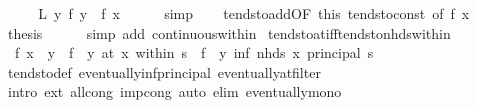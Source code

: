 \begin{isabellebody}
\ \ \isamarkupfalse%
\ \isamarkupfalse%
\ {\isachardoublequoteopen}{\isacharquery}{\kern0pt}L\ {\isacharparenleft}{\kern0pt}{\isasymlambda}y{\isachardot}{\kern0pt}\ f\ y\ {\isacharminus}{\kern0pt}\ f\ x{\isacharparenright}{\kern0pt}{\isachardoublequoteclose}\isanewline
\ \ \ \ \isamarkupfalse%
\ simp\isanewline
\ \ \isamarkupfalse%
\ tendsto{\isacharunderscore}{\kern0pt}add{\isacharbrackleft}{\kern0pt}OF\ this\ tendsto{\isacharunderscore}{\kern0pt}const{\isacharcomma}{\kern0pt}\ of\ {\isachardoublequoteopen}f\ x{\isachardoublequoteclose}{\isacharbrackright}{\kern0pt}\ \isamarkupfalse%
\ {\isacharquery}{\kern0pt}thesis\isanewline
\ \ \ \ \isamarkupfalse%
\ {\isacharparenleft}{\kern0pt}simp\ add{\isacharcolon}{\kern0pt}\ continuous{\isacharunderscore}{\kern0pt}within{\isacharparenright}{\kern0pt}\isanewline
{}\isamarkupfalse%
%
\endisatagproof
{\isafoldproof}%
%
\isadelimproof
%
\endisadelimproof
%
\isadelimdocument
%
\endisadelimdocument
%
\isatagdocument
%
\isamarkuptrue%
%
\endisatagdocument
{\isafolddocument}%
%
\isadelimdocument
%
\endisadelimdocument
{}\isamarkupfalse%
\ tendsto{\isacharunderscore}{\kern0pt}at{\isacharunderscore}{\kern0pt}iff{\isacharunderscore}{\kern0pt}tendsto{\isacharunderscore}{\kern0pt}nhds{\isacharunderscore}{\kern0pt}within{\isacharcolon}{\kern0pt}\isanewline
\ \ {\isachardoublequoteopen}f\ x\ {\isacharequal}{\kern0pt}\ y\ {\isasymLongrightarrow}\ {\isacharparenleft}{\kern0pt}f\ {\isasymlonglongrightarrow}\ y{\isacharparenright}{\kern0pt}\ {\isacharparenleft}{\kern0pt}at\ x\ within\ s{\isacharparenright}{\kern0pt}\ {\isasymlongleftrightarrow}\ {\isacharparenleft}{\kern0pt}f\ {\isasymlonglongrightarrow}\ y{\isacharparenright}{\kern0pt}\ {\isacharparenleft}{\kern0pt}inf\ {\isacharparenleft}{\kern0pt}nhds\ x{\isacharparenright}{\kern0pt}\ {\isacharparenleft}{\kern0pt}principal\ s{\isacharparenright}{\kern0pt}{\isacharparenright}{\kern0pt}{\isachardoublequoteclose}\isanewline
%
\isadelimproof
\ \ %
\endisadelimproof
%
\isatagproof
{}\isamarkupfalse%
\ tendsto{\isacharunderscore}{\kern0pt}def\ eventually{\isacharunderscore}{\kern0pt}inf{\isacharunderscore}{\kern0pt}principal\ eventually{\isacharunderscore}{\kern0pt}at{\isacharunderscore}{\kern0pt}filter\isanewline
\ \ \isamarkupfalse%
\ {\isacharparenleft}{\kern0pt}intro\ ext\ all{\isacharunderscore}{\kern0pt}cong\ imp{\isacharunderscore}{\kern0pt}cong{\isacharparenright}{\kern0pt}\ {\isacharparenleft}{\kern0pt}auto\ elim{\isacharbang}{\kern0pt}{\isacharcolon}{\kern0pt}\ eventually{\isacharunderscore}{\kern0pt}mono{\isacharparenright}{\kern0pt}%

\end{isabellebody}
